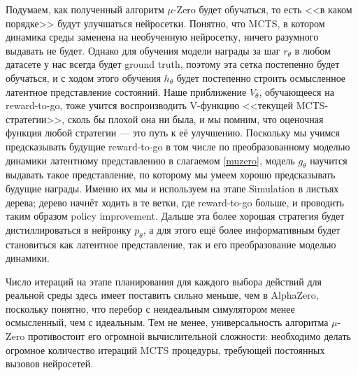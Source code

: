 Подумаем, как полученный алгоритм $\mu$-Zero будет обучаться, то есть <<в каком порядке>> будут улучшаться нейросетки. Понятно, что MCTS, в котором динамика среды заменена на необученную нейросетку, ничего разумного выдавать не будет. Однако для обучения модели награды за шаг $r_{\theta}$ в любом датасете у нас всегда будет ground truth, поэтому эта сетка постепенно будет обучаться, и с ходом этого обучения $h_{\theta}$ будет постепенно строить осмысленное латентное представление состояний. Наше приближение $V_{\theta}$, обучающееся на reward-to-go, тоже учится воспроизводить V-функцию <<текущей MCTS-стратегии>>, сколь бы плохой она ни была, и мы помним, что оценочная функция любой стратегии --- это путь к её улучшению. Поскольку мы учимся предсказывать будущие reward-to-go в том числе по преобразованному моделью динамики латентному представлению в слагаемом \eqref{muzero}, модель $g_{\theta}$ научится выдавать такое представление, по которому мы умеем хорошо предсказывать будущие награды. Именно их мы и используем на этапе Simulation в листьях дерева; дерево начнёт ходить в те ветки, где reward-to-go больше, и проводить таким образом policy improvement. Дальше эта более хорошая стратегия будет дистиллироваться в нейронку $p_{\theta}$, а для этого ещё более информативным будет становиться как латентное представление, так и его преобразование моделью динамики.

\begin{remark}
Число итераций на этапе планирования для каждого выбора действий для реальной среды здесь имеет поставить сильно меньше, чем в AlphaZero, поскольку понятно, что перебор с неидеальным симулятором менее осмысленный, чем с идеальным. Тем не менее, универсальность алгоритма $\mu$-Zero противостоит его огромной вычислительной сложности: необходимо делать огромное количество итераций MCTS процедуры, требующей постоянных вызовов нейросетей. 
\end{remark}